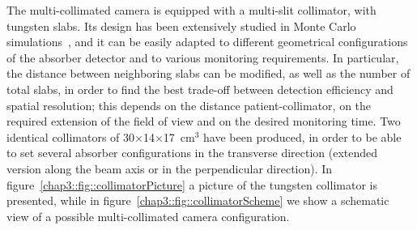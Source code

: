 The multi-collimated camera is equipped with a multi-slit collimator, with tungsten slabs. Its design has been extensively studied in Monte Carlo simulations~\parencite{Pinto2014}, and it can be easily adapted to different geometrical configurations of the absorber detector and to various monitoring requirements. In particular, the distance between neighboring slabs can be modified, as well as the number of total slabs, in order to find the best trade-off between detection efficiency and spatial resolution; this depends on the distance patient-collimator, on the required extension of the field of view and on the desired monitoring time. Two identical collimators of 30$\times$14$\times$17~cm$^{3}$ have been produced, in order to be able to set several absorber configurations in the transverse direction (extended version along the beam axis or in the perpendicular direction). In figure~\ref{chap3::fig::collimatorPicture} a picture of the tungsten collimator is presented, while in figure~\ref{chap3::fig::collimatorScheme} we show a schematic view of a possible multi-collimated camera configuration.\\

